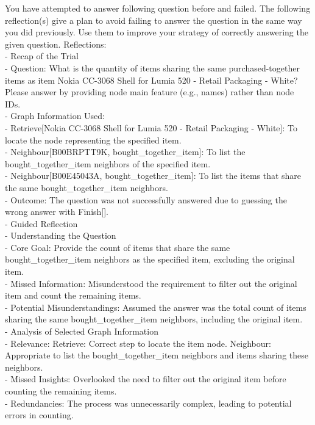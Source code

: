 \documentclass[11pt]{article}
\begin{document}
\begin{tcolorbox}[colback=white!10!white, colframe=blue!30!black, title=Reflection (Amazon), boxrule=1pt, fontupper={\fontsize{7pt}{9pt}\selectfont}]
\justifying
\noindent
\raggedright
You have attempted to answer following question before and failed. The following reflection(s) give a plan to avoid failing to answer the question in the same way you did previously. Use them to improve your strategy of correctly answering the given question.
Reflections:\\
- Recap of the Trial\\
    - Question: What is the quantity of items sharing the same purchased-together items as item Nokia CC-3068 Shell for Lumia 520 - Retail Packaging - White? Please answer by providing node main feature (e.g., names) rather than node IDs.\\
    - Graph Information Used:\\
  - Retrieve[Nokia CC-3068 Shell for Lumia 520 - Retail Packaging - White]: To locate the node representing the specified item.\\
  - Neighbour[B00BRPTT9K, bought\_together\_item]: To list the bought\_together\_item neighbors of the specified item.\\
  - Neighbour[B00E45043A, bought\_together\_item]: To list the items that share the same bought\_together\_item neighbors.\\
- Outcome: The question was not successfully answered due to guessing the wrong answer with Finish[].\\
- Guided Reflection\\
  - Understanding the Question\\
    - Core Goal: Provide the count of items that share the same bought\_together\_item neighbors as the specified item, excluding the original item.\\
    - Missed Information: Misunderstood the requirement to filter out the original item and count the remaining items.\\
    - Potential Misunderstandings: Assumed the answer was the total count of items sharing the same bought\_together\_item neighbors, including the original item.\\
  - Analysis of Selected Graph Information\\
    - Relevance: Retrieve: Correct step to locate the item node. Neighbour: Appropriate to list the bought\_together\_item neighbors and items sharing these neighbors.\\
    - Missed Insights: Overlooked the need to filter out the original item before counting the remaining items.\\
    - Redundancies: The process was unnecessarily complex, leading to potential errors in counting.\\


\end{tcolorbox}
\end{document}

